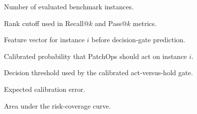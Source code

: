 
\begin{description}[style=nextline,leftmargin=1.7in,labelwidth=1.35in,font=\normalfont\bfseries]
\item[\(N\)] Number of evaluated benchmark instances.
\item[\(k\)] Rank cutoff used in Recall@\(k\) and Pass@\(k\) metrics.
\item[\(x_i\)] Feature vector for instance \(i\) before decision-gate prediction.
\item[\(p_{i,\mathrm{cal}}\)] Calibrated probability that PatchOps should act on instance \(i\).
\item[\(\tau\)] Decision threshold used by the calibrated act-versus-hold gate.
\item[\(\mathrm{ECE}\)] Expected calibration error.
\item[\(\mathrm{AURC}\)] Area under the risk-coverage curve.
\end{description}
\clearpage

